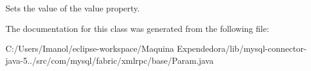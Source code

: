 Sets the value of the value property. 

The documentation for this class was generated from the following file\+:\begin{DoxyCompactItemize}
\item 
C\+:/\+Users/\+Imanol/eclipse-\/workspace/\+Maquina Expendedora/lib/mysql-\/connector-\/java-\/5../src/com/mysql/fabric/xmlrpc/base/Param.\+java\end{DoxyCompactItemize}
